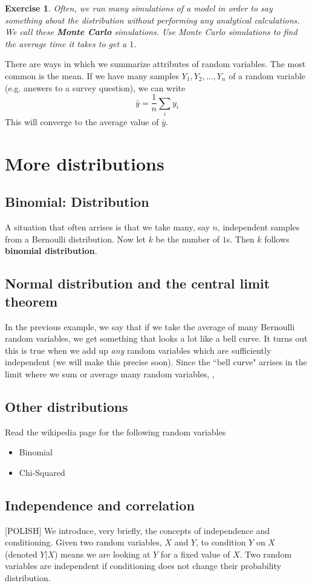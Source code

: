 \documentclass{amsart}
\newtheorem{exercise}{Exercise}
\begin{document}
\begin{exercise}
Often, we run many simulations of a model in order to say something about the distribution without performing any analytical calculations. We call these {\bf Monte Carlo} simulations. Use Monte Carlo simulations to find the average time it takes to get a $1$. 
\end{exercise}

There are ways in which we summarize attributes of random variables. The most common is the mean. If we have many samples $Y_1,Y_2,\dots,Y_n$ of a random variable (e.g. answers to a survey question), we can write 
\begin{equation}
\bar{y} = \frac{1}{n}\sum_{i}y_i
\end{equation}
This will converge to the average value of $\bar{y}$. 




\section{More distributions}
\subsection{Binomial: Distribution}

A situation that often arrises is that we take many, say $n$, independent samples from a Bernoulli distribution. Now let $k$ be the number of $1$s. Then $k$ follows {\bf binomial distribution}. 

\subsection{Normal distribution and the central limit theorem}

In the previous example, we say that if we take the average of many Bernoulli random variables, we get something that looks a lot like a bell curve. It turns out this is true when we add up \emph{any} random variables which are sufficiently independent (we will make this precise soon). Since the ``bell curve" arrises in the limit where we sum or average many random variables, , 

\subsection{Other distributions}
Read the wikipedia page for the following random variables
\begin{itemize}
\item Binomial
\item Chi-Squared
\end{itemize}

\subsection{Independence and correlation} [POLISH] We introduce, very briefly, the concepts of independence and conditioning. Given two random variables, $X$ and $Y$, to condition $Y$ on $X$ (denoted $Y|X$) means we are looking at $Y$ for a fixed value of $X$. 
Two random variables are independent if conditioning does not change their probability distribution. 
\end{document}
